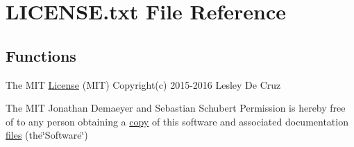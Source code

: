 \hypertarget{LICENSE_8txt}{}\section{L\+I\+C\+E\+N\+S\+E.\+txt File Reference}
\label{LICENSE_8txt}
\subsection*{Functions}
\begin{DoxyCompactItemize}
\item 
The M\+IT \hyperlink{LICENSE_8txt_abc604b88f50c7d6c53d7d423bf0bc90e}{License} (M\+IT) Copyright(c) 2015-\/2016 Lesley De Cruz
\item 
The M\+IT Jonathan Demaeyer and Sebastian Schubert Permission is hereby free of to any person obtaining a \hyperlink{LICENSE_8txt_a51c339ce34cc545067d7d7c01c627159}{copy} of this software and associated documentation \hyperlink{LICENSE_8txt_a2f26e987dc4c0911157946b04ff21156}{files} (the\char`\"{}Software\char`\"{})
\end{DoxyCompactItemize}
